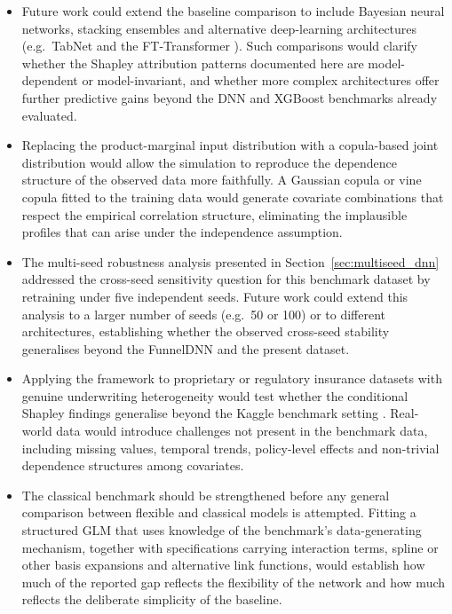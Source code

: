 \begin{itemize}
    \item Future work could extend the baseline comparison to include
          Bayesian neural networks, stacking ensembles and alternative
          deep-learning architectures (e.g.\ TabNet
          \citep{arik2021tabnet} and the FT-Transformer
          \citep{gorishniy2021revisiting}).
          Such comparisons would clarify whether the Shapley attribution
          patterns documented here are model-dependent or model-invariant,
          and whether more complex architectures offer further predictive
          gains beyond the DNN and XGBoost benchmarks already evaluated.

    \item Replacing the product-marginal input distribution with a
          copula-based joint distribution would allow the simulation to
          reproduce the dependence structure of the observed data more
          faithfully.  A Gaussian copula or vine copula fitted to the
          training data would generate covariate combinations that respect
          the empirical correlation structure, eliminating the implausible
          profiles that can arise under the independence assumption.

    \item The multi-seed robustness analysis presented in
          Section~\ref{sec:multiseed_dnn} addressed the cross-seed
          sensitivity question for this benchmark dataset by retraining
          under five independent seeds.  Future work could extend this
          analysis to a larger number of seeds (e.g.\ 50 or 100) or to
          different architectures, establishing whether the observed
          cross-seed stability generalises beyond the FunnelDNN and the
          present dataset.

    \item Applying the framework to proprietary or regulatory insurance
          datasets with genuine underwriting heterogeneity would test
          whether the conditional Shapley findings generalise beyond the
          Kaggle benchmark setting \citep{kaggleInsuranceDataML}.  Real-world data would introduce
          challenges not present in the benchmark data, including missing
          values, temporal trends, policy-level effects and non-trivial
          dependence structures among covariates.

    \item The classical benchmark should be strengthened before any
          general comparison between flexible and classical models is
          attempted.  Fitting a structured GLM that uses knowledge of the
          benchmark's data-generating mechanism, together with
          specifications carrying interaction terms, spline or other basis
          expansions and alternative link functions, would establish how
          much of the reported gap reflects the flexibility of the network
          and how much reflects the deliberate simplicity of the baseline.


\end{itemize}
